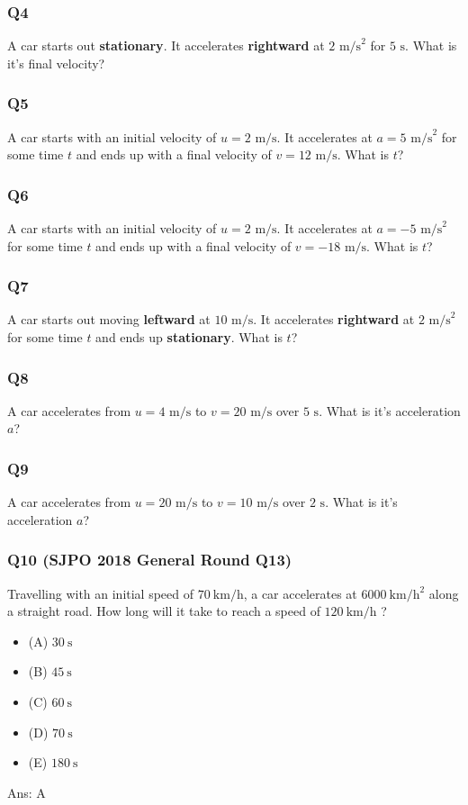 \documentclass{article}
\begin{document}
\subsubsection{Q4}
A car starts out \textbf{stationary}. It accelerates \textbf{rightward} at $2\text{ m/s}^2$ for $5\text{ s}$. What is it's final velocity? \\[50pt]
\subsubsection{Q5}
A car starts with an initial velocity of $u=2 \text{ m/s}$. It accelerates at $a=5\text{ m/s}^2$ for some time $t$ and ends up with a final velocity of $v=12 \text{ m/s}$. What is $t$? \\[50pt]
\subsubsection{Q6}
A car starts with an initial velocity of $u=2 \text{ m/s}$. It accelerates at $a=-5\text{ m/s}^2$ for some time $t$ and ends up with a final velocity of $v=-18 \text{ m/s}$. What is $t$? \\[50pt]
\subsubsection{Q7}
A car starts out moving \textbf{leftward} at $10 \text{ m/s}$. It accelerates \textbf{rightward} at $2\text{ m/s}^2$ for some time $t$ and ends up \textbf{stationary}. What is $t$? \\[50pt]
\subsubsection{Q8}
A car accelerates from $u=4\text{ m/s}$ to $v=20\text{ m/s}$ over $5\text{ s}$. What is it's acceleration $a$? \\[50pt]
\subsubsection{Q9}
A car accelerates from $u=20\text{ m/s}$ to $v=10\text{ m/s}$ over $2\text{ s}$. What is it's acceleration $a$? \\[50pt]
\subsubsection{Q10 (SJPO 2018 General Round Q13)}
Travelling with an initial speed of $70 \mathrm{~km} / \mathrm{h}$, a car accelerates at $6000 \mathrm{~km} / \mathrm{h}^2$ along a straight road. How long will it take to reach a speed of $120 \mathrm{~km} / \mathrm{h}$ ?
\begin{itemize}
\item[] (A) $30 \mathrm{~s}$
\item[] (B) $45 \mathrm{~s}$
\item[] (C) $60 \mathrm{~s}$
\item[] (D) $70 \mathrm{~s}$
\item[] (E) $180 \mathrm{~s}$
\end{itemize}
Ans: \ifpaper A \fi
\newpage
\end{document}
